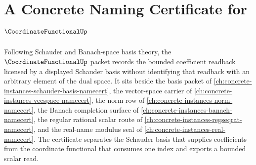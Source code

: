 \chapter{A Concrete Naming Certificate for $\CoordinateFunctionalUp$}
\label{ch:concrete-instances-coordinate-functional-namecert}

Following Schauder and Banach-space basis theory, the $\CoordinateFunctionalUp$ packet records the bounded coefficient readback licensed by a displayed Schauder basis without identifying that readback with an arbitrary element of the dual space. It sits beside the basis packet of \autoref{ch:concrete-instances-schauder-basis-namecert}, the vector-space carrier of \autoref{ch:concrete-instances-vecspace-namecert}, the norm row of \autoref{ch:concrete-instances-norm-namecert}, the Banach completion surface of \autoref{ch:concrete-instances-banach-namecert}, the regular rational scalar route of \autoref{ch:concrete-instances-regseqrat-namecert}, and the real-name modulus seal of \autoref{ch:concrete-instances-real-namecert}. The certificate separates the Schauder basis that supplies coefficients from the coordinate functional that consumes one index and exports a bounded scalar read.

